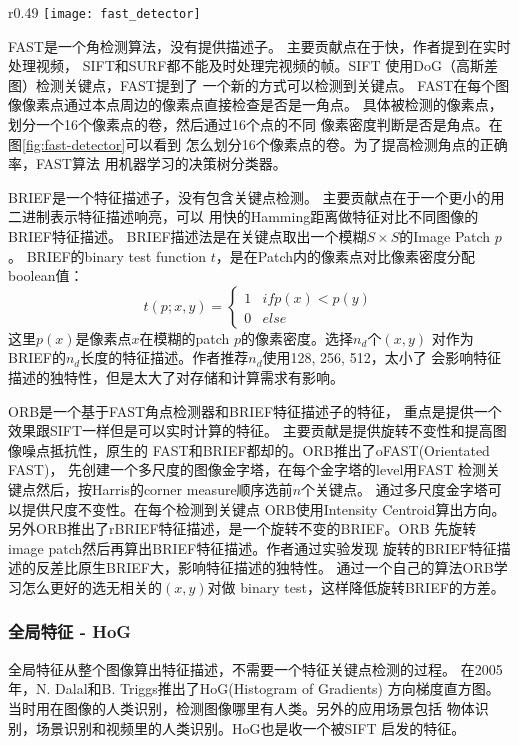 \clearpage
\begin{wrapfigure}{r}{0.49\textwidth}
  \centering
    \texttt{[image: fast\_detector]}
    \caption{FAST检测角点做法。\cite{fast2006machine}}
  \label{fig:fast-detector}
\end{wrapfigure}

FAST是一个角检测算法，没有提供描述子。
主要贡献点在于快，作者提到在实时处理视频，
SIFT和SURF都不能及时处理完视频的帧。SIFT
使用DoG（高斯差图）检测关键点，FAST提到了
一个新的方式可以检测到关键点。
FAST在每个图像像素点通过本点周边的像素点直接检查是否是一角点。
具体被检测的像素点，划分一个16个像素点的卷，然后通过16个点的不同
像素密度判断是否是角点。在图\ref{fig:fast-detector}可以看到
怎么划分16个像素点的卷。为了提高检测角点的正确率，FAST算法
用机器学习的决策树分类器。

BRIEF是一个特征描述子，没有包含关键点检测。\cite{calonder2010brief}
主要贡献点在于一个更小的用二进制表示特征描述响亮，可以
用快的Hamming距离做特征对比不同图像的BRIEF特征描述。
BRIEF描述法是在关键点取出一个模糊$S \times S$的Image Patch $p$。
BRIEF的binary test function $t$，是在Patch内的像素点对比像素密度分配boolean值：
$$
t(p; x, y) = \begin{cases} 
      1 & if p(x) < p(y) \\
      0 & else 
 \end{cases}
$$
这里$p(x)$是像素点$x$在模糊的patch $p$的像素密度。选择$n_d$个$(x, y)$
对作为BRIEF的$n_d$长度的特征描述。作者推荐$n_d$使用128, 256, 512，太小了
会影响特征描述的独特性，但是太大了对存储和计算需求有影响。

ORB是一个基于FAST角点检测器和BRIEF特征描述子的特征，
重点是提供一个效果跟SIFT一样但是可以实时计算的特征。
主要贡献是提供旋转不变性和提高图像噪点抵抗性，原生的
FAST和BRIEF都却的。ORB推出了oFAST(Orientated FAST)，
先创建一个多尺度的图像金字塔，在每个金字塔的level用FAST
检测关键点然后，按Harris的corner measure顺序选前$n$个关键点。
通过多尺度金字塔可以提供尺度不变性。在每个检测到关键点
ORB使用Intensity Centroid算出方向。
另外ORB推出了rBRIEF特征描述，是一个旋转不变的BRIEF。ORB
先旋转image patch然后再算出BRIEF特征描述。作者通过实验发现
旋转的BRIEF特征描述的反差比原生BRIEF大，影响特征描述的独特性。
通过一个自己的算法ORB学习怎么更好的选无相关的$(x, y)$对做
binary test，这样降低旋转BRIEF的方差。


\subsubsection{全局特征 - HoG}
全局特征从整个图像算出特征描述，不需要一个特征关键点检测的过程。
在2005年，N. Dalal和B. Triggs推出了HoG(Histogram of Gradients)
方向梯度直方图。\cite{dalal2005histograms}
当时用在图像的人类识别，检测图像哪里有人类。另外的应用场景包括
物体识别，场景识别和视频里的人类识别。HoG也是收一个被SIFT
启发的特征。


